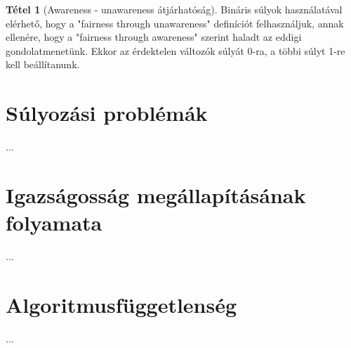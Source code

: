 \documentclass{article}
\theoremstyle{definition}
\newtheorem{theorem}{Tétel}[section]
\begin{document}
\begin{multicols}{2}
    \begin{theorem}[Awareness - unawareness átjárhatóság]
        Bináris súlyok használatával elérhető, hogy a "fairness through unawareness" definíciót felhasználjuk, annak ellenére, hogy a "fairness through awareness" szerint haladt az eddigi gondolatmenetünk. Ekkor az érdektelen változók súlyát 0-ra, a többi súlyt 1-re kell beállítanunk.
    \end{theorem}
    
    

\section{Súlyozási problémák}
    ...

\section{Igazságosság megállapításának folyamata}
    ...

\section{Algoritmusfüggetlenség}
    ...
    
\end{multicols}
    
\end{document}
